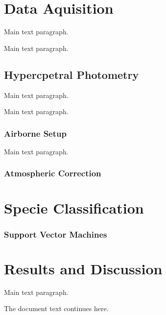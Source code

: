 \documentclass[remotesensing,article,accept,moreauthors,pdftex,12pt,a4paper]{mdpi}
\begin{document}
\section{Data Aquisition}

Main text paragraph.

Main text paragraph.


\subsection{Hypercpetral Photometry}

Main text paragraph.

Main text paragraph.

\subsubsection{Airborne Setup}

Main text paragraph.

\subsubsection{Atmospheric Correction}

\section{Specie Classification}

\subsubsection{Support Vector Machines}



\section{Results and Discussion}

Main text paragraph.


The document text continues here.

\end{document}
